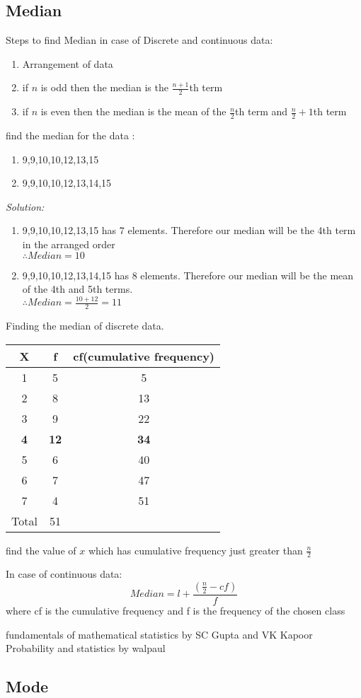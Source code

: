 \documentclass[11pt,letterpaper]{article}
\newenvironment{problem}[2][Problem]                                  
        {\begin{tcolorbox}[colback=white,colframe=gray!50,title=#1 #2]}
        {\end{tcolorbox}}
\newenvironment{solution}                      
        {\begin{mdframed}\textit{Solution:} \\}
        {\end{mdframed}}
\begin{document}
\subsection{Median}
Steps to find Median in case of Discrete and continuous data:

\begin{enumerate}
  \item Arrangement of data
  \item if $n$ is odd then the median is the $ \frac{n+1}{2}$th term
  \item if $n$ is even then the median is the mean of the $\frac{n}{2}$th term and $\frac{n}{2}+1$th term
\end{enumerate}
\begin{problem}3
   find the median for the data : 
   \begin{enumerate}
      \item 9,9,10,10,12,13,15
      \item 9,9,10,10,12,13,14,15
   \end{enumerate}
\end{problem}

\begin{solution}
  \begin{enumerate}
    \item 9,9,10,10,12,13,15 has 7 elements. Therefore our median will be the 4th term in the arranged order\\
      $ \therefore Median = 10 $
    \item 9,9,10,10,12,13,14,15 has 8 elements. Therefore our median will be the mean of the 4th and 5th terms. \\
      $\therefore Median = \frac{10+12}{2}= 11$
  \end{enumerate}
\end{solution}

\begin{problem} 4
  Finding the median of discrete data. 
  \begin{center}
    \begin{tabular}{c|c|c}
      X & f & cf(cumulative frequency)\\
      \hline
      1 & 5 & 5\\ 
      2 & 8 & 13\\ 
      3 & 9 & 22\\ 
      \textbf{4} & \textbf{12} & \textbf{34}\\ 
      5 & 6 & 40\\ 
      6 & 7 & 47\\ 
      7 & 4 & 51\\ 
      \hline
      Total & 51 \\
    \end{tabular}
  \end{center}

  find the value of $x$ which has cumulative frequency just greater than $\frac{n}{2}$
\end{problem}

In case of continuous data:
\[
  Median = l + \frac{\left( \frac{n}{2} - cf \right)}{f}
\]
where cf is the cumulative frequency and f is the frequency of the chosen class

fundamentals of mathematical statistics by SC Gupta and VK Kapoor 
Probability and statistics by walpaul
\subsection{Mode}
\end{document}
